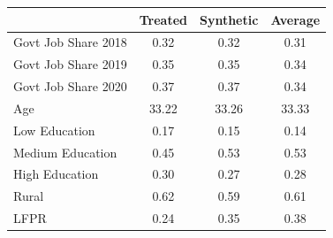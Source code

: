 \begin{tabular}{l*{3}{c}}
\hline\hline
            &     Treated&   Synthetic&     Average\\
\hline
Govt Job Share 2018&        0.32&        0.32&        0.31\\
Govt Job Share 2019&        0.35&        0.35&        0.34\\
Govt Job Share 2020&        0.37&        0.37&        0.34\\
Age         &       33.22&       33.26&       33.33\\
Low Education&        0.17&        0.15&        0.14\\
Medium Education&        0.45&        0.53&        0.53\\
High Education&        0.30&        0.27&        0.28\\
Rural       &        0.62&        0.59&        0.61\\
LFPR        &        0.24&        0.35&        0.38\\
\hline\hline
\end{tabular}
